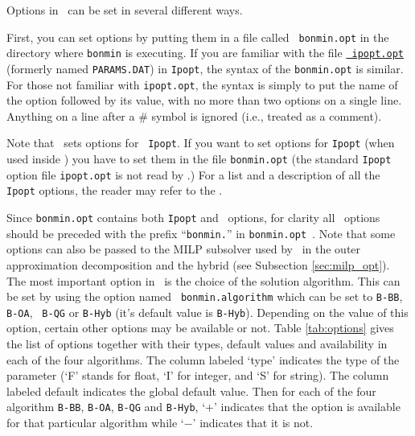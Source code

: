 \StartPageSummary
{}
\EndPageSummary
\NavigationPanel

Options in \Bonmin\ can be set in several different ways.

First, you can set options by putting them in a file called {\tt
bonmin.opt} in the directory where {\tt bonmin} is executing. If you
are familiar with the file
\href{http://www.coin-or.org/Ipopt/documentation/node38.html}{\tt
ipopt.opt} (formerly named {\tt PARAMS.DAT}) in {\tt Ipopt}, the
syntax of the {\tt bonmin.opt} is similar. For those not familiar
with {\tt ipopt.opt}, the syntax is simply to put the name of the
option followed by its value, with no more than two options on a
single line. Anything on a line after a \# symbol is ignored (i.e.,
treated as a comment).

Note that \Bonmin\ sets options for {\tt
Ipopt}. If you want to set options for {\tt Ipopt} (when used inside \Bonmin) you have to set them
in the file {\tt bonmin.opt} (the standard {\tt Ipopt} option file {\tt ipopt.opt}
is not read by \Bonmin.)
For a list and a description of all the {\tt Ipopt} options, the
reader may refer to the
.

Since {\tt bonmin.opt} contains both {\tt Ipopt} and \Bonmin\ options, for clarity
all \Bonmin\ options should be preceded with the prefix ``{\tt bonmin.}'' in {\tt bonmin.opt}~.
Note that some options can also be passed to the MILP subsolver used by \Bonmin\
in the outer approximation decomposition
and the hybrid (see Subsection \ref{sec:milp_opt}).\\

The most important option in \Bonmin\ is the choice of the solution
algorithm. This can be set by using the option named {\tt
bonmin.algorithm} which can be set to {\tt B-BB}, {\tt B-OA}, {\tt
B-QG} or {\tt B-Hyb} (it's default value is {\tt B-Hyb}). Depending
on the value of this option, certain other options may be available
or not. Table \ref{tab:options} gives the list of options together
with their types, default values and availability in each of the
four algorithms. The column labeled `type' indicates the type of the
parameter (`F' stands for float, `I' for integer, and `S' for
string). The column labeled default indicates the global default
value. Then for each of the four algorithm {\tt B-BB}, {\tt B-OA},
{\tt B-QG} and {\tt B-Hyb}, `$+$' indicates that the option is
available for that particular algorithm
while `$-$' indicates that it is not.\\

